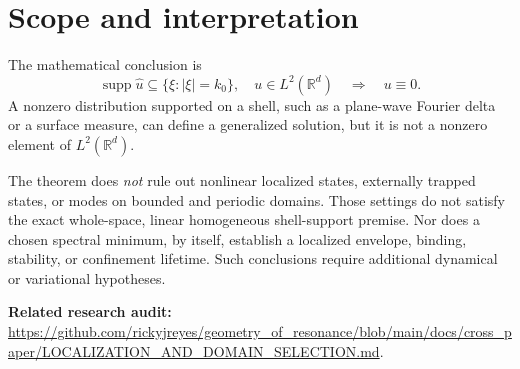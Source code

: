 \documentclass[11pt]{article}
\theoremstyle{remark}
\newcommand{\R}{\mathbb{R}}
\newcommand{\supp}{\operatorname{supp}}
\begin{document}
\section{Scope and interpretation}
The mathematical conclusion is
\begin{equation}
 \boxed{
 \supp\widehat u\subseteq\{\xi:|\xi|=k_0\},\quad
 u\in L^2(\R^d)
 \quad\Longrightarrow\quad u\equiv0.
 }
 \label{eq:conclusion}
\end{equation}
A nonzero distribution supported on a shell, such as a plane-wave
Fourier delta or a surface measure, can define a generalized
solution, but it is not a nonzero element of $L^2(\R^d)$.

The theorem does \emph{not} rule out nonlinear localized states,
externally trapped states, or modes on bounded and periodic domains.
Those settings do not satisfy the exact whole-space, linear
homogeneous shell-support premise.  Nor does a chosen spectral
minimum, by itself, establish a localized envelope, binding,
stability, or confinement lifetime.  Such conclusions require
additional dynamical or variational hypotheses.

\noindent\textbf{Related research audit:}
\url{https://github.com/rickyjreyes/geometry_of_resonance/blob/main/docs/cross_paper/LOCALIZATION_AND_DOMAIN_SELECTION.md}.
\end{document}
